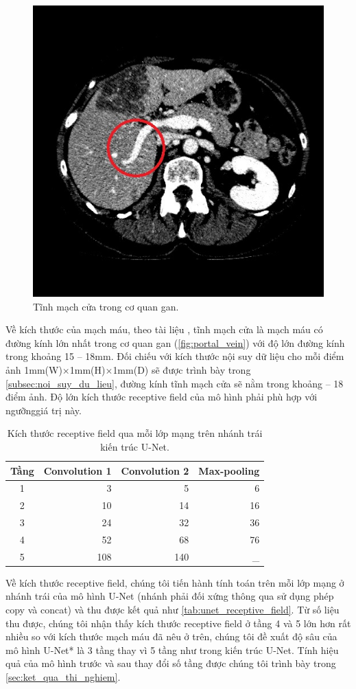 	\begin{figure}[h!]
		\centering
		\includegraphics[width=.3\textwidth]{figures/portal_vein}
		\caption{Tĩnh mạch cửa trong cơ quan gan.}
		\label{fig:portal_vein}
	\end{figure}
	Về kích thước của mạch máu, theo tài liệu \cite{covey2004incidence}, tĩnh mạch cửa là mạch máu có đường kính lớn nhất trong cơ quan gan (\autoref{fig:portal_vein}) với độ lớn đường kính trong khoảng 15 -- 18mm. Đối chiếu với kích thước nội suy dữ liệu cho mỗi điểm ảnh 1mm(W)$\times$1mm(H)$\times$1mm(D) sẽ được trình bày trong \autoref{subsec:noi_suy_du_lieu}, đường kính tĩnh mạch cửa sẽ nằm trong khoảng -- 18 điểm ảnh. Độ lớn kích thước receptive field của mô hình phải phù hợp với ngưỡng\linebreak giá trị này.
	
	\begin{table}[h!]
		\centering
		\caption{Kích thước receptive field qua mỗi lớp mạng trên nhánh trái kiến trúc U-Net.}
		\label{tab:unet_receptive_field}
		\begin{tabular}{crrr}
			\toprule
			\textbf{Tầng} & \multicolumn{1}{l}{\textbf{Convolution 1}} & \multicolumn{1}{l}{\textbf{Convolution 2}} & \multicolumn{1}{l}{\textbf{Max-pooling}} \\ \midrule
			1 & 3 & 5 & 6 \\[1mm]
			2 & 10 & 14 & 16 \\[1mm]
			3 & 24 & 32 & 36 \\[1mm]
			4 & 52 & 68 & 76 \\[1mm]
			5 & 108 & 140 &  \_\\ \bottomrule
		\end{tabular}
	\end{table}
	Về kích thước receptive field, chúng tôi tiến hành tính toán trên mỗi lớp mạng ở nhánh trái của mô hình U-Net (nhánh phải đối xứng thông qua sử dụng phép copy và concat) và thu được kết quả như \autoref{tab:unet_receptive_field}. Từ số liệu thu được, chúng tôi nhận thấy kích thước receptive field ở tầng 4 và 5 lớn hơn rất nhiều so với kích thước mạch máu đã nêu ở trên, chúng tôi đề xuất độ sâu của mô hình U-Net* là 3 tầng thay vì 5 tầng như trong kiến trúc U-Net. Tính hiệu quả của mô hình trước và sau thay đổi số tầng được chúng tôi trình bày trong \autoref{sec:ket_qua_thi_nghiem}.

